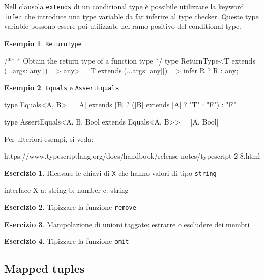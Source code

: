 \documentclass[12pt]{article}
\theoremstyle{definition}
\newtheorem{example}{Esempio}[subsection]
\newtheorem{exercise}{Esercizio}[subsection]
\newenvironment{code}
  {\vspace{0.5cm} \VerbatimEnvironment\begin{typescriptcode}}
  {\end{typescriptcode} \vspace{0.2cm}}
\begin{document}
Nell clausola \texttt{extends} di un conditional type è possibile utilizzare la keyword \texttt{infer} che introduce
una type variable da far inferire al type checker. Queste type variable possono essere poi utilizzate nel ramo positivo
del conditional type.

\begin{example}
\texttt{ReturnType}

\begin{code}
/**
 * Obtain the return type of a function type
 */
type ReturnType<T extends (...args: any[]) => any> =
  T extends (...args: any[]) => infer R ? R : any;
\end{code}
\end{example}

\begin{example}
\texttt{Equals} e \texttt{AssertEquals}

\begin{code}
type Equals<A, B> = [A] extends [B] ?
  ([B] extends [A] ? "T" : "F") : "F"

type AssertEquals<A, B, Bool extends Equals<A, B>> = [A, Bool]
\end{code}
\end{example}

Per ulteriori esempi, si veda:

https://www.typescriptlang.org/docs/handbook/release-notes/typescript-2-8.html

\begin{exercise}
Ricavare le chiavi di \texttt{X} che hanno valori di tipo \texttt{string}

\begin{code}
interface X {
  a: string
  b: number
  c: string
}
\end{code}
\end{exercise}

\begin{exercise}
Tipizzare la funzione \texttt{remove}
\end{exercise}

\begin{exercise}
Manipolazione di unioni taggate: estrarre o escludere dei membri
\end{exercise}

\begin{exercise}
Tipizzare la funzione \texttt{omit}
\end{exercise}

\subsection{Mapped tuples}
\end{document}
